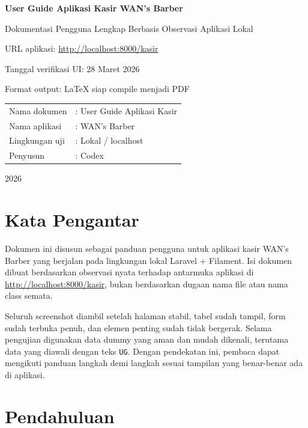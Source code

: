 \documentclass[12pt,a4paper]{article}
\begin{document}
\begin{titlepage}
    \centering
    \vspace*{2cm}
    {\LARGE \textbf{User Guide Aplikasi Kasir WAN's Barber}\par}
    \vspace{0.8cm}
    {\large Dokumentasi Pengguna Lengkap Berbasis Observasi Aplikasi Lokal\par}
    \vspace{1.5cm}
    {\large URL aplikasi: \url{http://localhost:8000/kasir}\par}
    \vspace{0.5cm}
    {\large Tanggal verifikasi UI: 28 Maret 2026\par}
    \vspace{0.5cm}
    {\large Format output: LaTeX siap compile menjadi PDF\par}
    \vfill
    \begin{tabular}{ll}
        Nama dokumen & : User Guide Aplikasi Kasir \\
        Nama aplikasi & : WAN's Barber \\
        Lingkungan uji & : Lokal / localhost \\
        Penyusun & : Codex \\
    \end{tabular}
    \vfill
    {\large 2026\par}
\end{titlepage}

\section*{Kata Pengantar}
Dokumen ini disusun sebagai panduan pengguna untuk aplikasi kasir WAN's Barber yang berjalan pada lingkungan lokal Laravel + Filament. Isi dokumen dibuat berdasarkan observasi nyata terhadap antarmuka aplikasi di \url{http://localhost:8000/kasir}, bukan berdasarkan dugaan nama file atau nama class semata.

Seluruh screenshot diambil setelah halaman stabil, tabel sudah tampil, form sudah terbuka penuh, dan elemen penting sudah tidak bergerak. Selama pengujian digunakan data dummy yang aman dan mudah dikenali, terutama data yang diawali dengan teks \texttt{UG}. Dengan pendekatan ini, pembaca dapat mengikuti panduan langkah demi langkah sesuai tampilan yang benar-benar ada di aplikasi.

\tableofcontents
\clearpage

\section{Pendahuluan}
\end{document}
